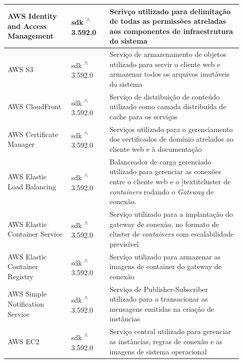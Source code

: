 \begin{longtable}{p{0.25\linewidth} p{0.15\linewidth} p{0.525\linewidth}}
\hline

AWS Identity and Access Management \citep{awsiamdocs} & sdk \textsuperscript{$\wedge$}3.592.0 & Serivço utilizado para delimitação de todas as permissões atreladas aos componentes de infraestrutura do sistema \\

\hline

AWS S3 \citep{awss3docs} & sdk \textsuperscript{$\wedge$}3.592.0 & Serviço de armazenamento de objetos utilizado para servir o cliente web e armazenar todos os arquivos imutáveis do sistema \\

\hline

AWS CloudFront \citep{awscloudfrontdocs} & sdk \textsuperscript{$\wedge$}3.592.0 & Serviço de distribuição de conteúdo utilizado como camada distribuída de cache para os serviços \\

\hline

AWS Certificate Manager \citep{awscertificatemanagerdocs} & sdk \textsuperscript{$\wedge$}3.592.0 & Serviços utilizado para o gerenciamento dos certificados de domínio atrelados ao cliente web e à documentação \\

\hline

AWS Elastic Load Balancing \citep{awselasticloadbalancing} & sdk \textsuperscript{$\wedge$}3.592.0 & Balanceador de carga gerenciado utilizado para gerenciar as conexões entre o cliente web e o ]textit{cluster} de \textit{containers} rodando o \textit{Gateway} de conexão. \\

\hline

AWS Elastic Container Service \citep{awsecsdocs} & sdk \textsuperscript{$\wedge$}3.592.0 & Serviço utilizado para a implantação do gateway de conexão, no formato de cluster de \textit{containers} com escalabilidade previsível \\

\hline

AWS Elastic Container Registry \citep{awsecrdocs} & sdk \textsuperscript{$\wedge$}3.592.0 & Serviço utilizado para armazenar as imagens de container do gateway de conexão \\

\hline

AWS Simple Notification Service \citep{awssnsdocs} & sdk \textsuperscript{$\wedge$}3.592.0 & Serviço de Publisher-Subscriber utilizado para a transacionar as mensagens emitidas na criação de instâncias \\

\hline

AWS EC2 \citep{awsec2docs} & sdk \textsuperscript{$\wedge$}3.592.0 & Serviço central utilizado para gerenciar as instâncias, regras de conexão e as imagens de sistema operacional \\

\hline

\end{longtable}

